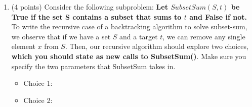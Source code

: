\documentclass[11pt]{article}
\begin{document}
\begin{enumerate}
    \item (4 points) Consider the following subproblem: \textbf{Let $SubsetSum(S,
    t)$ be True if the set S contains a subset that sums to $t$ and False if
    not.} To write the recursive case of a backtracking algorithm to
    solve subset-sum, we observe that if we have a set $S$ and a target $t$, we
    can remove any single element $x$ from $S$. Then, our recursive algorithm should explore
    two choices, \textbf{which you should state as new calls to SubsetSum()}. Make sure you specify
    the two parameters that SubsetSum takes in.
    \begin{itemize}
        \item Choice 1:
        \vspace{1in}
        \item Choice 2:
        \vspace{1in}
    \end{itemize}


\end{enumerate}
\end{document}

